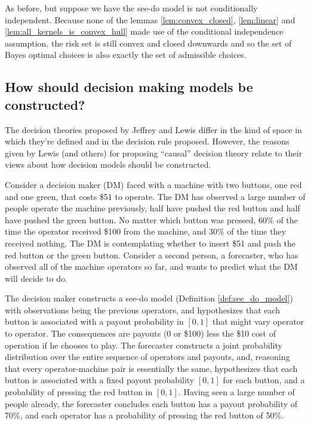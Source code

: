 \begin{example}\label{ex:cc_nonsdt}
As before, but suppose we have the see-do model is not conditionally independent. Because none of the lemmas \ref{lem:convex_closed}, \ref{lem:linear} and \ref{lem:all_kernels_is_convex_hull} made use of the conditional independence assumption, the risk set is still convex and closed downwards and so the set of Bayes optimal choices is also exactly the set of admissible choices.
\end{example}

\subsection{How should decision making models be constructed?}\label{sec:how_to_construct}

The decision theories proposed by Jeffrey and Lewis differ in the kind of space in which they're defined and in the decision rule proposed. However, the reasons given by Lewis (and others) for proposing ``causal'' decision theory relate to their views about how decision models should be constructed.

Consider a decision maker (DM) faced with a machine with two buttons, one red and one green, that costs \$51 to operate. The DM has observed a large number of people operate the machine previously, half have pushed the red button and half have pushed the green button. No matter which button was pressed, 60\% of the time the operator received \$100 from the machine, and 30\% of the time they received nothing. The DM is contemplating whether to insert \$51 and push the red button or the green button. Consider a second person, a forecaster, who has observed all of the machine operators so far, and wants to predict what the DM will decide to do.

The decision maker constructs a see-do model (Definition \ref{def:see_do_model}) with observations being the previous operators, and hypothesizes that each button is associated with a payout probability in $[0,1]$ that might vary operator to operator. The consequences are payouts (0 or \$100) less the \$10 cost of operation if he chooses to play. The forecaster constructs a joint probability distribution over the entire sequence of operators and payouts, and, reasoning that every operator-machine pair is essentially the same, hypothesizes that each button is associated with a fixed payout probability $[0,1]$ for each button, and a probability of pressing the red button in $[0,1]$. Having seen a large number of people already, the forecaster concludes each button has a payout probability of 70\%, and each operator has a probability of pressing the red button of 50\%.

